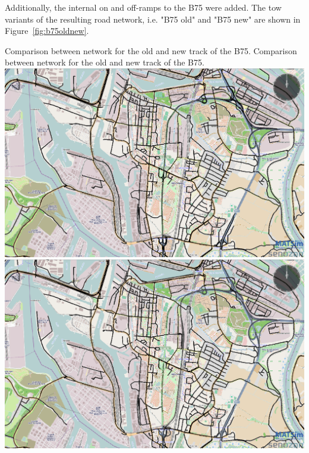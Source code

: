 Additionally, the internal on and off-ramps to the B75 were added. The tow variants of the resulting road network, i.e. "B75 old" and "B75 new" are shown in Figure~\ref{fig:b75oldnew}.



\createfigure%
{Comparison between network for the old and new track of the B75.}%
{Comparison between network for the old and new track of the B75.}%
{\label{fig:b75oldnew}}%
{%
  \createsubfigure%
  {}%
  {\includegraphics[width=.475\linewidth]{using/figures/b75old}}%
  {}%
  {}%
  \createsubfigure%
  {}%
  {\includegraphics[width=.475\linewidth]{using/figures/b75new}}
  {}%
  {}%
}%
  {}%



